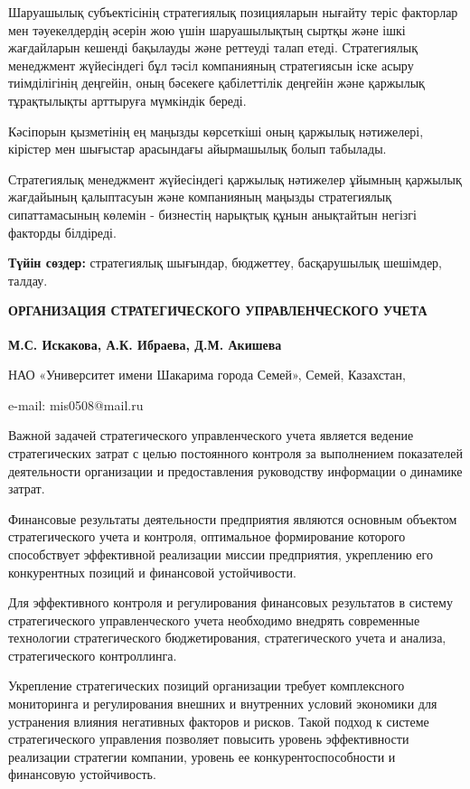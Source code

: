 Шаруашылық субъектісінің стратегиялық позицияларын нығайту теріс
факторлар мен тәуекелдердің әсерін жою үшін шаруашылықтың сыртқы және
ішкі жағдайларын кешенді бақылауды және реттеуді талап етеді.
Стратегиялық менеджмент жүйесіндегі бұл тәсіл компанияның стратегиясын
іске асыру тиімділігінің деңгейін, оның бәсекеге қабілеттілік деңгейін
және қаржылық тұрақтылықты арттыруға мүмкіндік береді.

Кәсіпорын қызметінің ең маңызды көрсеткіші оның қаржылық нәтижелері,
кірістер мен шығыстар арасындағы айырмашылық болып табылады.

Стратегиялық менеджмент жүйесіндегі қаржылық нәтижелер ұйымның қаржылық
жағдайының қалыптасуын және компанияның маңызды стратегиялық
сипаттамасының көлемін - бизнестің нарықтық құнын анықтайтын негізгі
факторды білдіреді.

{\bfseries Түйін сөздер:} стратегиялық шығындар, бюджеттеу, басқарушылық
шешімдер, талдау.

{\bfseries ОРГАНИЗАЦИЯ СТРАТЕГИЧЕСКОГО УПРАВЛЕНЧЕСКОГО УЧЕТА}

{\bfseries М.С. Искакова\textsuperscript{\envelope }, А.К. Ибраева, Д.М. Акишева}

НАО «Университет имени Шакарима города Семей», Семей, Казахстан,

e-mail: mis0508@mail.ru

Важной задачей стратегического управленческого учета является ведение
стратегических затрат с целью постоянного контроля за выполнением
показателей деятельности организации и предоставления руководству
информации о динамике затрат.

Финансовые результаты деятельности предприятия являются основным
объектом стратегического учета и контроля, оптимальное формирование
которого способствует эффективной реализации миссии предприятия,
укреплению его конкурентных позиций и финансовой устойчивости.

Для эффективного контроля и регулирования финансовых результатов в
систему стратегического управленческого учета необходимо внедрять
современные технологии стратегического бюджетирования, стратегического
учета и анализа, стратегического контроллинга.

Укрепление стратегических позиций организации требует комплексного
мониторинга и регулирования внешних и внутренних условий экономики для
устранения влияния негативных факторов и рисков. Такой подход к системе
стратегического управления позволяет повысить уровень эффективности
реализации стратегии компании, уровень ее конкурентоспособности и
финансовую устойчивость.

